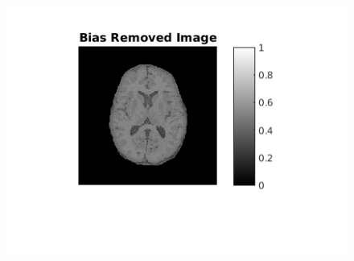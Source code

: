 \documentclass[11pt]{article}
\begin{document}
\begin{figure}[h]
\centering
\includegraphics[]{biasRemoved}
\end{figure}
\end{document}
